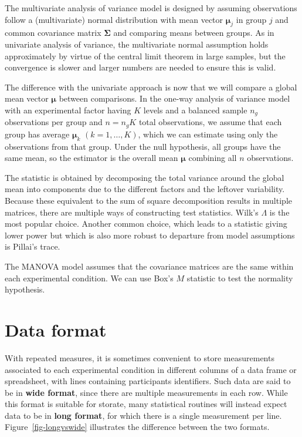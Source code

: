 \documentclass[
  11pt,
  letterpaper,
]{scrbook}
\theoremstyle{definition}
\theoremstyle{definition}
\theoremstyle{remark}
\begin{document}
The multivariate analysis of variance model is designed by assuming
observations follow a (multivariate) normal distribution with mean
vector \(\boldsymbol{\mu}_j\) in group \(j\) and common covariance
matrix \(\boldsymbol{\Sigma}\) and comparing means between groups. As in
univariate analysis of variance, the multivariate normal assumption
holds approximately by virtue of the central limit theorem in large
samples, but the convergence is slower and larger numbers are needed to
ensure this is valid.

The difference with the univariate approach is now that we will compare
a global mean vector \(\boldsymbol{\mu}\) between comparisons. In the
one-way analysis of variance model with an experimental factor having
\(K\) levels and a balanced sample \(n_g\) observations per group and
\(n=n_gK\) total observations, we assume that each group has average
\(\boldsymbol{\mu}_k\) \((k=1, \ldots, K)\), which we can estimate using
only the observations from that group. Under the null hypothesis, all
groups have the same mean, so the estimator is the overall mean
\(\boldsymbol{\mu}\) combining all \(n\) observations.

The statistic is obtained by decomposing the total variance around the
global mean into components due to the different factors and the
leftover variability. Because these equivalent to the sum of square
decomposition results in multiple matrices, there are multiple ways of
constructing test statistics. Wilk's \(\Lambda\) is the most popular
choice. Another common choice, which leads to a statistic giving lower
power but which is also more robust to departure from model assumptions
is Pillai's trace.

The MANOVA model assumes that the covariance matrices are the same
within each experimental condition. We can use Box's \(M\) statistic to
test the normality hypothesis.

\section{Data format}\label{data-format}

With repeated measures, it is sometimes convenient to store measurements
associated to each experimental condition in different columns of a data
frame or spreadsheet, with lines containing participants identifiers.
Such data are said to be in \textbf{wide format}, since there are
multiple measurements in each row. While this format is suitable for
storate, many statistical routines will instead expect data to be in
\textbf{long format}, for which there is a single measurement per line.
Figure~\ref{fig-longvswide} illustrates the difference between the two
formats.
\end{document}
